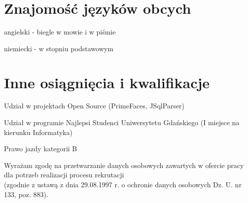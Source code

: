\documentclass[letterpaper]{article}
\renewenvironment{itemize}{
  \begin{list}{}{
    \setlength{\leftmargin}{1.5em}
  }
}{
  \end{list}
}
\begin{document}
\section*{Znajomość języków obcych}

\begin{itemize}
\item angielski - biegle w mowie i w piśmie
\item niemiecki - w stopniu podstawowym
\end{itemize}


\section*{Inne osiągnięcia i kwalifikacje}

\begin{itemize}
\item Udział w projektach Open Source (PrimeFaces, JSqlParser)
\item Udział w programie Najlepsi Studenci Uniwersytetu Gdańskiego (I miejsce na kierunku Informatyka)
\item Prawo jazdy kategorii B
\end{itemize}


\vfill

\begin{center}
  \begin{footnotesize}
    Wyrażam zgodę na przetwarzanie danych osobowych zawartych w ofercie pracy dla potrzeb realizacji procesu rekrutacji\\
    (zgodnie z ustawą z dnia 29.08.1997 r. o ochronie danych osobowych Dz. U. nr 133, poz. 883).
  \end{footnotesize}
\end{center}
\end{document}
